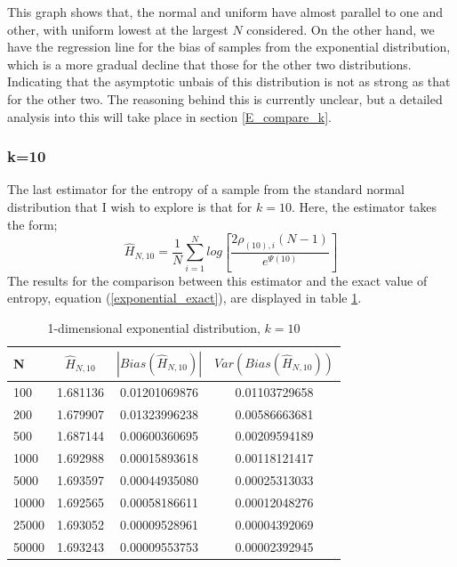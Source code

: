 \documentclass{article}
\begin{document}
This graph shows that, the normal and uniform have almost parallel to one and other, with uniform lowest at the largest $N$ considered. On the other hand, we have the regression line for the bias of samples from the exponential distribution, which is a more gradual decline that those for the other two distributions. Indicating that the asymptotic unbais of this distribution is not as strong as that for the other two. The reasoning behind this is currently unclear, but a detailed analysis into this will take place in section \ref{E_compare_k}.





\subsubsection{k=10} \label{E_k=10}

The last estimator for the entropy of a sample from the standard normal distribution that I wish to explore is that for $k=10$. Here, the estimator takes the form;
\begin{equation}
\hat{H}_{N, 10} = \frac{1}{N} \sum_{i=1}^{N} log \left[ \frac{2\rho_{(10),i}(N-1)}{e^{\Psi(10)}} \right] \nonumber
\end{equation}
The results for the comparison between this estimator and the exact value of entropy, equation (\ref{exponential_exact}), are displayed in table \ref{expo_k=10_table}.

\begin{table}
\caption{1-dimensional exponential distribution, $k=10$} \label{expo_k=10_table}
\begin{center}
\begin{tabular}{| l | c c c|} 
\toprule
N & $\hat{H}_{N, 10}$ & $|Bias(\hat{H}_{N, 10})|$ & $Var(Bias(\hat{H}_{N, 10}))$ \\
\midrule[1pt]
100     & 1.681136     & 0.01201069876     & 0.01103729658  \\
200     & 1.679907     & 0.01323996238     & 0.00586663681  \\
500     & 1.687144     & 0.00600360695     & 0.00209594189  \\
1000    & 1.692988     & 0.00015893618     & 0.00118121417  \\
5000    & 1.693597     & 0.00044935080     & 0.00025313033  \\
10000   & 1.692565     & 0.00058186611     & 0.00012048276  \\
25000   & 1.693052     & 0.00009528961     & 0.00004392069  \\
50000   & 1.693243     & 0.00009553753     & 0.00002392945  \\
\hline
\end{tabular}
\end{center}
\end{table}
\end{document}
